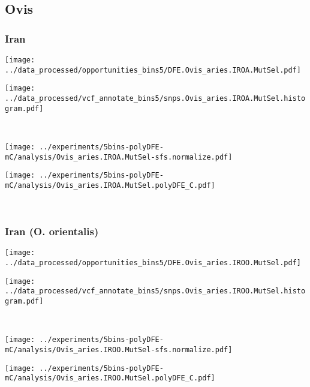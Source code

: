 \subsection{Ovis}

\subsubsection{Iran}

\begin{minipage}{0.49\linewidth}
    \texttt{[image: ../data\_processed/opportunities\_bins5/DFE.Ovis\_aries.IROA.MutSel.pdf]}
\end{minipage}
\begin{minipage}{0.49\linewidth}
    \texttt{[image: ../data\_processed/vcf\_annotate\_bins5/snps.Ovis\_aries.IROA.MutSel.histogram.pdf]}
\end{minipage}
\\
\begin{minipage}{0.49\linewidth}
    \texttt{[image: ../experiments/5bins-polyDFE-mC/analysis/Ovis\_aries.IROA.MutSel-sfs.normalize.pdf]}
\end{minipage}
\begin{minipage}{0.49\linewidth}
    \texttt{[image: ../experiments/5bins-polyDFE-mC/analysis/Ovis\_aries.IROA.MutSel.polyDFE\_C.pdf]}
\end{minipage}
\\

\subsubsection{Iran (O. orientalis)}

\begin{minipage}{0.49\linewidth}
    \texttt{[image: ../data\_processed/opportunities\_bins5/DFE.Ovis\_aries.IROO.MutSel.pdf]}
\end{minipage}
\begin{minipage}{0.49\linewidth}
    \texttt{[image: ../data\_processed/vcf\_annotate\_bins5/snps.Ovis\_aries.IROO.MutSel.histogram.pdf]}
\end{minipage}
\\
\begin{minipage}{0.49\linewidth}
    \texttt{[image: ../experiments/5bins-polyDFE-mC/analysis/Ovis\_aries.IROO.MutSel-sfs.normalize.pdf]}
\end{minipage}
\begin{minipage}{0.49\linewidth}
    \texttt{[image: ../experiments/5bins-polyDFE-mC/analysis/Ovis\_aries.IROO.MutSel.polyDFE\_C.pdf]}
\end{minipage}
\\

